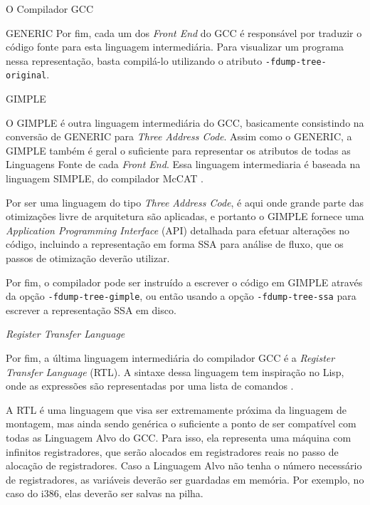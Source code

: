 \begin{section}{O Compilador GCC}
\begin{subsection}{GENERIC}
    Por fim, cada um dos \textit{Front End} do GCC é responsável por traduzir o
código fonte para esta linguagem intermediária. Para visualizar um programa
nessa representação, basta compilá-lo utilizando o atributo
\texttt{-fdump-tree-original}.

\end{subsection}

\begin{subsection}{GIMPLE}

O GIMPLE é outra linguagem intermediária do GCC, basicamente consistindo na
conversão de GENERIC para \textit{Three Address Code}. Assim como o
GENERIC, a GIMPLE também é geral o suficiente para representar os atributos
de todas as Linguagens Fonte de cada \textit{Front End}.  Essa linguagem
intermediaria é baseada na linguagem SIMPLE, do compilador McCAT \citep{gimple}.

    Por ser uma linguagem do tipo \textit{Three Address Code}, é aqui onde
grande parte das otimizações livre de arquitetura são aplicadas, e portanto o
GIMPLE fornece uma \textit{Application Programming Interface} (API) detalhada
para efetuar alterações no código, incluindo a representação em forma SSA para análise
de fluxo, que os passos de otimização deverão utilizar.

    Por fim, o compilador pode ser instruído a escrever o código em
GIMPLE através da opção \texttt{-fdump-tree-gimple}, ou então usando
a opção \texttt{-fdump-tree-ssa} para escrever a representação SSA
em disco.

\end{subsection}

\begin{subsection}{\textit{Register Transfer Language}}

    Por fim, a última linguagem intermediária do compilador GCC é a
\textit{Register Transfer Language} (RTL). A sintaxe dessa linguagem
tem inspiração no Lisp, onde as expressões são representadas por uma
lista de comandos \citep{rtl}.

    A RTL é uma linguagem que visa ser extremamente próxima da linguagem
de montagem, mas ainda sendo genérica o suficiente a ponto de ser compatível
com todas as Linguagem Alvo do GCC.
Para isso, ela representa uma máquina com infinitos
registradores, que serão alocados em registradores reais no passo de alocação de
registradores. Caso a Linguagem Alvo não tenha o número necessário de
registradores, as variáveis deverão ser guardadas em memória. Por exemplo,
no caso do i386, elas deverão ser salvas na pilha.


\end{subsection}
\end{section}
